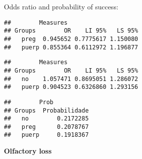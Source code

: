 \documentclass[
]{article}
\newenvironment{Shaded}{\begin{snugshade}}{\end{snugshade}}
\newcommand{\CommentTok}[1]{\textcolor[rgb]{0.56,0.35,0.01}{\textit{#1}}}
\newcommand{\KeywordTok}[1]{\textcolor[rgb]{0.13,0.29,0.53}{\textbf{#1}}}
\newcommand{\NormalTok}[1]{#1}
\newcommand{\OperatorTok}[1]{\textcolor[rgb]{0.81,0.36,0.00}{\textbf{#1}}}
\begin{document}
Odds ratio and probability of success:

\begin{Shaded}
\end{Shaded}

\begin{verbatim}
##        Measures
## Groups        OR    LI 95%   LS 95%
##   preg  0.945652 0.7775617 1.150080
##   puerp 0.855364 0.6112972 1.196877
\end{verbatim}

\begin{Shaded}
\end{Shaded}

\begin{verbatim}
##        Measures
## Groups        OR    LI 95%   LS 95%
##   no    1.057471 0.8695051 1.286072
##   puerp 0.904523 0.6326860 1.293156
\end{verbatim}

\begin{Shaded}
\end{Shaded}

\begin{verbatim}
##        Prob
## Groups  Probabilidade
##   no        0.2172285
##   preg      0.2078767
##   puerp     0.1918367
\end{verbatim}

\textbf{Olfactory loss}
\end{document}
